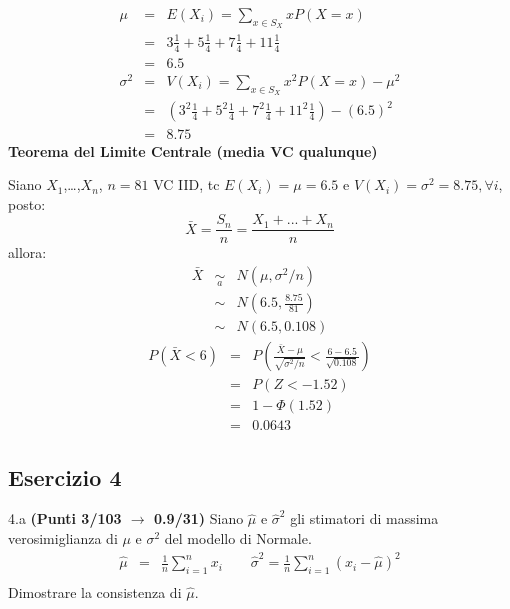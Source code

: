 \documentclass[
  11pt,
]{book}
\theoremstyle{mytheoremstyle}
\theoremstyle{mydefstyle}
\newenvironment{sol}
  {
  \begin{tcolorbox}[enhanced,breakable,arc=0.1mm,boxrule=1pt,colback=white,colframe=iblue,
  title=\bf \fontfamily{lmss}\selectfont \hspace{.5 cm} Soluzione,drop fuzzy shadow]

}{
\end{tcolorbox}
  }
\begin{document}
\begin{sol}
\begin{eqnarray*} \mu &=& E(X_i) = \sum_{x\in S_X}x P(X=x)\\ 
 &=&  3  \frac { 1 }{ 4 }+ 5  \frac { 1 }{ 4 }+ 7  \frac { 1 }{ 4 }+ 11  \frac { 1 }{ 4 } \\ 
            &=& 6.5 \\ 
 \sigma^2 &=& V(X_i) = \sum_{x\in S_X}x^2 P(X=x)-\mu^2\\ 
 &=&\left(  3  ^2\frac { 1 }{ 4 }+ 5  ^2\frac { 1 }{ 4 }+ 7  ^2\frac { 1 }{ 4 }+ 11  ^2\frac { 1 }{ 4 } \right)-( 6.5 )^2\\ 
            &=& 8.75 
\end{eqnarray*}
\textbf{Teorema del Limite Centrale (media VC qualunque)}

Siano \(X_1\),\ldots,\(X_n\), \(n=81\) VC IID, tc \(E(X_i)=\mu=6.5\) e \(V(X_i)=\sigma^2=8.75,\forall i\), posto:
\[
      \bar X=\frac{S_n}n =\frac{X_1 + ... + X_n}n
      \]
allora:\begin{eqnarray*}
  \bar X & \mathop{\sim}\limits_{a}& N(\mu,\sigma^2/n) \\
     &\sim & N\left(6.5,\frac{8.75}{81}\right) \\
     &\sim & N(6.5,0.108)
  \end{eqnarray*}\begin{eqnarray*}
      P( \bar X   <   6 ) 
        &=& P\left(  \frac { \bar X  -  \mu }{ \sqrt{\sigma^2/n} }  <  \frac { 6  -  6.5 }{\sqrt{ 0.108 }} \right)  \\
                 &=& P\left(  Z   <   -1.52 \right) \\    
                 &=&  1-\Phi( 1.52 ) \\ &=&  0.0643 
      \end{eqnarray*}

\end{sol}

\subsection{Esercizio 4}\label{esercizio-4-30}

4.a \textbf{(Punti 3/103 \(\rightarrow\) 0.9/31)} Siano \(\hat \mu\) e \(\hat\sigma^2\) gli stimatori di massima verosimiglianza di \(\mu\) e \(\sigma^2\) del modello di Normale.
\begin{eqnarray*}
  \hat\mu &=&  \frac 1n\sum_{i=1}^nx_i \qquad \hat\sigma^2 =  \frac 1n\sum_{i=1}^n(x_i-\hat\mu)^2\\
\end{eqnarray*}
Dimostrare la consistenza di \(\hat\mu\).
\end{document}

